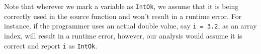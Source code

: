 Note that wherever we mark a variable as \texttt{IntOk}, we assume that it is
being correctly used in the source \matlab function and won't result in a
runtime error. For instance, if the programmer uses an actual double value, say
\texttt{i = 3.2}, as an array index, \matlab will result in a runtime error, however, our
analysis would assume it is correct and report \texttt{i} as \texttt{IntOk}.  

